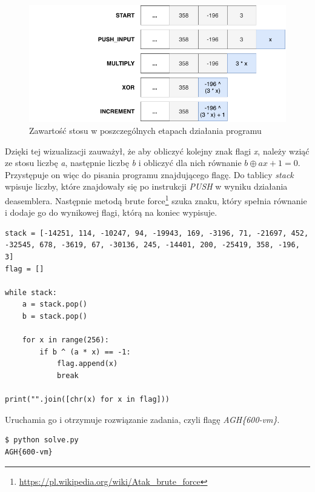 \documentclass[language=polish,type=eng]{aghmodern}
\begin{document}
\begin{figure}[H]
\centering
\includegraphics[width=12cm]{600_stack}
\caption{Zawartość stosu w poszczególnych etapach działania programu}
\label{fig:600_stack}
\end{figure}

Dzięki tej wizualizacji zauważył, że aby obliczyć kolejny znak flagi \emph{x},
należy wziąć ze stosu liczbę \emph{a}, następnie liczbę \emph{b}
i obliczyć dla nich równanie \(b \oplus ax + 1 = 0\).
Przystępuje on więc do pisania programu znajdującego flagę.
Do tablicy \emph{stack} wpisuje liczby, które znajdowały się po instrukcji
\emph{PUSH} w wyniku działania deasemblera. Następnie metodą brute force\footnote{
\url{https://pl.wikipedia.org/wiki/Atak_brute_force}} szuka znaku, który spełnia
równanie i dodaje go do wynikowej flagi, którą na koniec wypisuje.

\begin{verbatim}
stack = [-14251, 114, -10247, 94, -19943, 169, -3196, 71, -21697, 452, -32545, 678, -3619, 67, -30136, 245, -14401, 200, -25419, 358, -196, 3]
flag = []

while stack:
    a = stack.pop()
    b = stack.pop()

    for x in range(256):
        if b ^ (a * x) == -1:
            flag.append(x)
            break

print("".join([chr(x) for x in flag]))
\end{verbatim}

Uruchamia go i otrzymuje rozwiązanie zadania, czyli flagę \emph{AGH\{600-vm\}}.

\begin{verbatim}
$ python solve.py
AGH{600-vm}
\end{verbatim}

\backmatter

\cleardoublepage
\listoffigures


\cleardoublepage
\printbibliography
\end{document}
